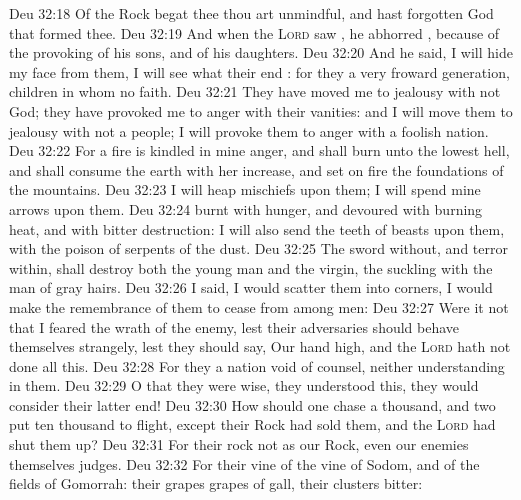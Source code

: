 \vs Deu 32:18 Of the Rock  begat thee thou art unmindful, and hast forgotten God that formed thee.
\vs Deu 32:19 And when the \textsc{Lord} saw , he abhorred , because of the provoking of his sons, and of his daughters.
\vs Deu 32:20 And he said, I will hide my face from them, I will see what their end : for they  a very froward generation, children in whom  no faith.
\vs Deu 32:21 They have moved me to jealousy with  not God; they have provoked me to anger with their vanities: and I will move them to jealousy with  not a people; I will provoke them to anger with a foolish nation.
\vs Deu 32:22 For a fire is kindled in mine anger, and shall burn unto the lowest hell, and shall consume the earth with her increase, and set on fire the foundations of the mountains.
\vs Deu 32:23 I will heap mischiefs upon them; I will spend mine arrows upon them.
\vs Deu 32:24  burnt with hunger, and devoured with burning heat, and with bitter destruction: I will also send the teeth of beasts upon them, with the poison of serpents of the dust.
\vs Deu 32:25 The sword without, and terror within, shall destroy both the young man and the virgin, the suckling  with the man of gray hairs.
\vs Deu 32:26 I said, I would scatter them into corners, I would make the remembrance of them to cease from among men:
\vs Deu 32:27 Were it not that I feared the wrath of the enemy, lest their adversaries should behave themselves strangely,  lest they should say, Our hand  high, and the \textsc{Lord} hath not done all this.
\vs Deu 32:28 For they  a nation void of counsel, neither  understanding in them.
\vs Deu 32:29 O that they were wise,  they understood this,  they would consider their latter end!
\vs Deu 32:30 How should one chase a thousand, and two put ten thousand to flight, except their Rock had sold them, and the \textsc{Lord} had shut them up?
\vs Deu 32:31 For their rock  not as our Rock, even our enemies themselves  judges.
\vs Deu 32:32 For their vine  of the vine of Sodom, and of the fields of Gomorrah: their grapes  grapes of gall, their clusters  bitter:

